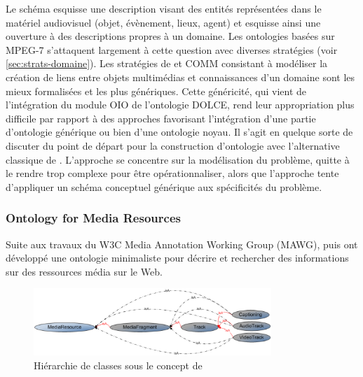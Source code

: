 Le schéma  esquisse une description visant des entités représentées dans le matériel audiovisuel (objet, évènement, lieux, agent) et esquisse ainsi une ouverture à des descriptions propres à un domaine.
Les ontologies basées sur MPEG-7 s'attaquent largement à cette question avec diverses stratégies (voir \ref{sec:strats-domaine}). 
Les stratégies de  et COMM consistant à modéliser la création de liens entre objets multimédias et connaissances d'un domaine sont les mieux formalisées et les plus génériques.
Cette généricité, qui vient de l'intégration du module OIO de l'ontologie DOLCE, rend leur appropriation plus difficile par rapport à des approches favorisant l'intégration d'une partie d'ontologie générique ou bien d'une ontologie noyau.
Il s'agit en quelque sorte de discuter du point de départ pour la construction d'ontologie avec l'alternative classique de  .
L'approche  se concentre sur la modélisation du problème, quitte à le rendre trop complexe pour être opérationnaliser, alors que l'approche  tente d'appliquer un schéma conceptuel générique aux spécificités du problème.





\subsubsection{Ontology for Media Resources}\label{sec:omr}
Suite aux travaux du W3C Media Annotation Working Group (MAWG), \cite{Burger2011} puis \cite{Lee2012} ont développé une ontologie minimaliste pour décrire et rechercher des informations sur des ressources média sur le Web.

\begin{figure}[ht!]
\centering
\includegraphics[width=0.8\textwidth]{images/MA-model.png}
\caption{Hiérarchie de classes sous le concept de }
\label{img:ma-model}
\end{figure}

